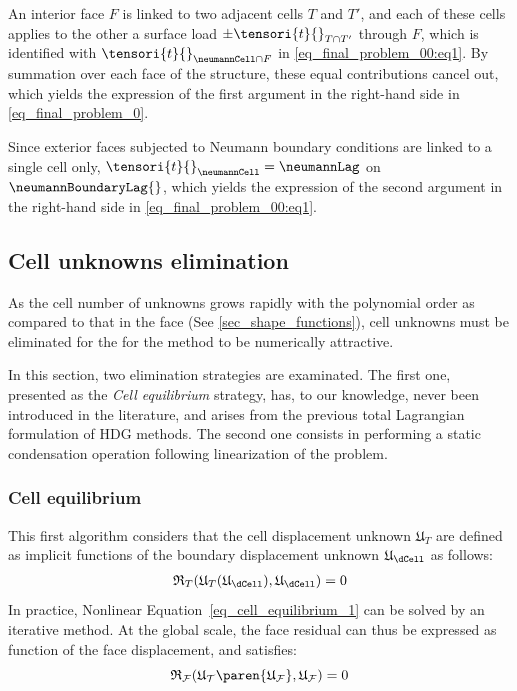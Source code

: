 An interior face $F$ is linked to two adjacent cells $T$ and $T'$, and
each of these cells applies to the other a surface load $\pm
\tensori{t}{}_{T\cap T'}$ through $F$, which is identified with
$\tensori{t}{}_{\neumannCell\cap F}$ in \eqref{eq_final_problem_00:eq1}.
By summation over each face of the structure, these equal contributions
cancel out, which yields the expression of the first argument in the
right-hand side in \eqref{eq_final_problem_0}.

Since exterior faces subjected to Neumann boundary conditions are
linked to a single cell only, $\tensori{t}{}_{\neumannCell} =
\neumannLag$ on $\neumannBoundaryLag{}$, which yields the expression of
the second argument in the right-hand side in
\eqref{eq_final_problem_00:eq1}.

\subsection{Cell unknowns elimination}

As the cell number of unknowns grows rapidly with the polynomial order
as compared to that in the face (See \ref{sec_shape_functions}), cell
unknowns must be eliminated for the for the method to be numerically
attractive.

In this section, two elimination strategies are examinated. The first
one, presented as the \textit{Cell equilibrium} strategy, has, to our
knowledge, never been introduced in the literature, and arises from the
previous total Lagrangian formulation of HDG methods. The second one
consists in performing a static condensation operation
\cite{abbas_hybrid_2018, abbas_hybrid_2019,di_pietro_hybrid_2015}
following linearization of the problem.

\subsubsection{Cell equilibrium}

This first algorithm considers that the cell displacement unknown
$\mathfrak{U}_{T}$ are defined as implicit functions of the boundary
displacement unknown $\mathfrak{U}_{\dCell}$ as follows:
\begin{equation}
  \label{eq_cell_equilibrium_1}
  \begin{aligned}
    \mathfrak{R}_{T}(\mathfrak{U}_{T}(\mathfrak{U}_{\dCell}),
    \mathfrak{U}_{\dCell}) = 0
  \end{aligned}
\end{equation}
In practice, Nonlinear Equation~\eqref{eq_cell_equilibrium_1} can be
solved by an iterative method. At the global scale, the face residual
can thus be expressed as function of the face displacement, and
satisfies:
\begin{equation}
  \label{eq_cell_equilibrium_face_residual}
  \mathfrak{R}_{\mathcal{F}}(\mathfrak{U}_{\mathcal{T}}\paren{\mathfrak{U}_{\mathcal{F}}},
 \mathfrak{U}_{\mathcal{F}})=0
\end{equation}

